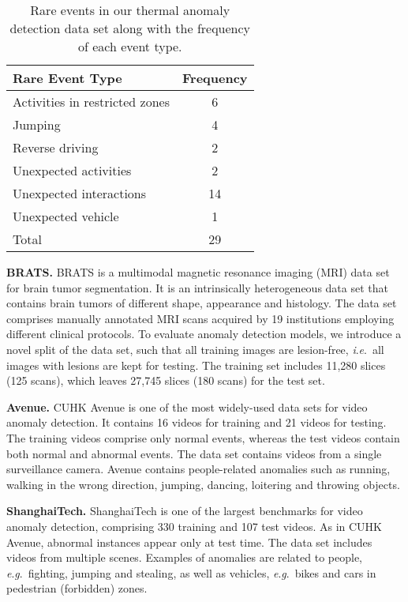 \documentclass[10pt,journal,compsoc]{IEEEtran}
\newcommand{\ie}{\textit{i}.\textit{e}.}
\newcommand{\eg}{\textit{e}.\textit{g}.}
\begin{document}
\begin{table}[t!]
\caption{Rare events in our thermal anomaly detection data set along with the frequency of each event type.}
\vspace{-0.2cm}
\centering 
\setlength\tabcolsep{5.0pt}
\small
\begin{tabular}{| l | c |} 
\hline
{Rare Event Type} & {Frequency} \\
\hline
\hline
Activities in restricted zones & 6  \\
Jumping & 4  \\
Reverse driving & 2  \\
Unexpected activities & 2 \\
Unexpected interactions & 14  \\
Unexpected vehicle & 1 \\
\hline
Total & 29\\
\hline
\end{tabular}
\vspace{0.1cm}
\label{table:rare_events} \end{table}

\noindent
\textbf{BRATS.}
BRATS \cite{Menze-TMI-2015} is a multimodal magnetic resonance imaging (MRI) data set for brain tumor segmentation. It is an intrinsically heterogeneous data set that contains brain tumors of different shape, appearance and histology. The data set comprises manually annotated MRI scans acquired by 19 institutions employing different clinical protocols. To evaluate anomaly detection models, we introduce a novel split of the data set, such that all training images are lesion-free, \ie~all images with lesions are kept for testing. The training set includes 11,280 slices (125 scans), which leaves 27,745 slices (180 scans) for the test set.

\noindent
\textbf{Avenue.}
CUHK Avenue \cite{Lu-ICCV-2013} is one of the most widely-used data sets for video anomaly detection. It contains 16 videos for training and 21 videos for testing. The training videos comprise only normal events, whereas the test videos contain both normal and abnormal events. The data set contains videos from a single surveillance camera. Avenue contains people-related anomalies such as running, walking in the wrong direction, jumping, dancing, loitering and throwing objects. 

\noindent
\textbf{ShanghaiTech.}
ShanghaiTech \cite{Luo-ICCV-2017} is one of the largest benchmarks for video anomaly detection, comprising 330 training and 107 test videos. As in CUHK Avenue, abnormal instances appear only at test time. The data set includes videos from multiple scenes. Examples of anomalies are related to people, \eg~fighting, jumping and stealing, as well as vehicles, \eg~bikes and cars in pedestrian (forbidden) zones. 
\end{document}
